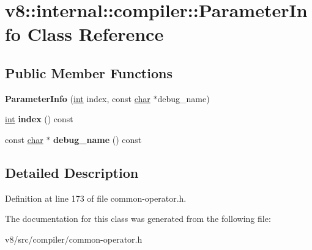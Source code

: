 \hypertarget{classv8_1_1internal_1_1compiler_1_1ParameterInfo}{}\section{v8\+:\+:internal\+:\+:compiler\+:\+:Parameter\+Info Class Reference}
\label{classv8_1_1internal_1_1compiler_1_1ParameterInfo}
\subsection*{Public Member Functions}
\begin{DoxyCompactItemize}
\item 
\mbox{\label{classv8_1_1internal_1_1compiler_1_1ParameterInfo_a344991550d3757b461766b420fd63f4b}} 
{\bfseries Parameter\+Info} (\mbox{\hyperlink{classint}{int}} index, const \mbox{\hyperlink{classchar}{char}} $\ast$debug\+\_\+name)
\item 
\mbox{\label{classv8_1_1internal_1_1compiler_1_1ParameterInfo_a64ad4d2a7e407d88e72180127d15d5a4}} 
\mbox{\hyperlink{classint}{int}} {\bfseries index} () const
\item 
\mbox{\label{classv8_1_1internal_1_1compiler_1_1ParameterInfo_ac9e9ae0d6390d857f1c104a4138d115c}} 
const \mbox{\hyperlink{classchar}{char}} $\ast$ {\bfseries debug\+\_\+name} () const
\end{DoxyCompactItemize}


\subsection{Detailed Description}


Definition at line 173 of file common-\/operator.\+h.



The documentation for this class was generated from the following file\+:\begin{DoxyCompactItemize}
\item 
v8/src/compiler/common-\/operator.\+h\end{DoxyCompactItemize}
